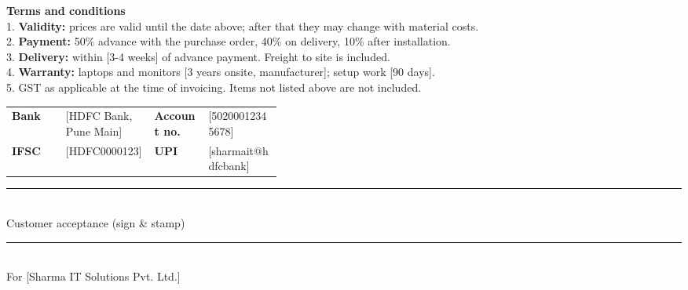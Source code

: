 \documentclass[10pt]{article}
\begin{document}
\noindent\colorbox{notebg}{\parbox{\dimexpr\linewidth-2\fboxsep}{\footnotesize {\color{accent}\bfseries Terms and conditions}\\ 1. \textbf{Validity:} prices are valid until the date above; after that they may change with material costs.\\ 2. \textbf{Payment:} 50\% advance with the purchase order, 40\% on delivery, 10\% after installation.\\ 3. \textbf{Delivery:} within [3-4 weeks] of advance payment. Freight to site is included.\\ 4. \textbf{Warranty:} laptops and monitors [3 years onsite, manufacturer]; setup work [90 days].\\ 5. GST as applicable at the time of invoicing. Items not listed above are not included.}}\par\vspace{6pt}

\begin{tabularx}{\linewidth}{@{}p{0.2\linewidth}X p{0.2\linewidth}X@{}}
\textbf{Bank} & [HDFC Bank, Pune Main] & \textbf{Account no.} & [50200012345678] \\
\textbf{IFSC} & [HDFC0000123] & \textbf{UPI} & [sharmait@hdfcbank] \\
\end{tabularx}\par\vspace{2pt}

\vspace{32pt}\noindent\parbox[t]{0.3\linewidth}{\centering\rule{\linewidth}{0.5pt}\\ Customer acceptance (sign \& stamp)}\hfill\parbox[t]{0.3\linewidth}{\centering\rule{\linewidth}{0.5pt}\\ For [Sharma IT Solutions Pvt. Ltd.]}\par
\end{document}
